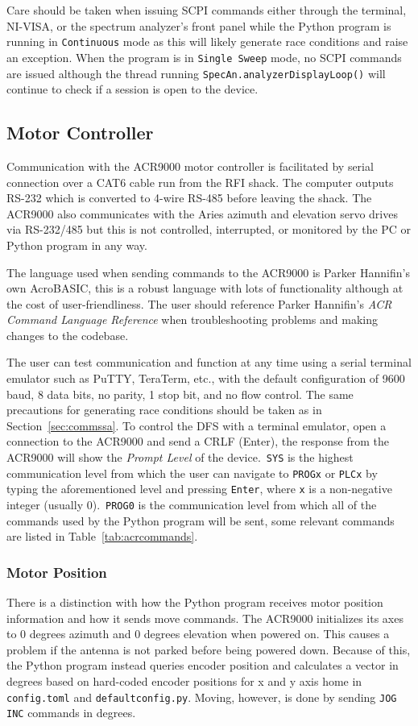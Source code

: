 \documentclass[titlepage]{article}
\begin{document}
Care should be taken when issuing SCPI commands either through the terminal, NI-VISA, or the spectrum analyzer's front panel while the Python program is running in \verb|Continuous| mode as this will likely generate race conditions and raise an exception. When the program is in \verb|Single Sweep| mode, no SCPI commands are issued although the thread running \verb|SpecAn.analyzerDisplayLoop()| will continue to check if a session is open to the device.

\subsection{Motor Controller}\label{sec:commsmc}
Communication with the ACR9000 motor controller is facilitated by serial connection over a CAT6 cable run from the RFI shack. The computer outputs RS-232 which is converted to 4-wire RS-485 before leaving the shack. The ACR9000 also communicates with the Aries azimuth and elevation servo drives via RS-232/485 but this is not controlled, interrupted, or monitored by the PC or Python program in any way.

The language used when sending commands to the ACR9000 is Parker Hannifin's own AcroBASIC, this is a robust language with lots of functionality although at the cost of user-friendliness. The user should reference Parker Hannifin's \textit{ACR Command Language Reference} when troubleshooting problems and making changes to the codebase.

The user can test communication and function at any time using a serial terminal emulator such as PuTTY, TeraTerm, etc., with the default configuration of 9600 baud, 8 data bits, no parity, 1 stop bit, and no flow control. The same precautions for generating race conditions should be taken as in Section~\ref{sec:commssa}. To control the DFS with a terminal emulator, open a connection to the ACR9000 and send a CRLF (Enter), the response from the ACR9000 will show the \textit{Prompt Level} of the device.\ \verb|SYS| is the highest communication level from which the user can navigate to \verb|PROGx| or \verb|PLCx| by typing the aforementioned level and pressing \verb|Enter|, where \verb|x| is a non-negative integer (usually 0).\ \verb|PROG0| is the communication level from which all of the commands used by the Python program will be sent, some relevant commands are listed in Table~\ref{tab:acrcommands}.

\subsubsection{Motor Position}\label{sec:motorpos}
There is a distinction with how the Python program receives motor position information and how it sends move commands. The ACR9000 initializes its axes to 0 degrees azimuth and 0 degrees elevation when powered on. This causes a problem if the antenna is not parked before being powered down. Because of this, the Python program instead queries encoder position and calculates a vector in degrees based on hard-coded encoder positions for x and y axis home in \verb|config.toml| and \verb|defaultconfig.py|. Moving, however, is done by sending \verb|JOG INC| commands in degrees.
\end{document}
